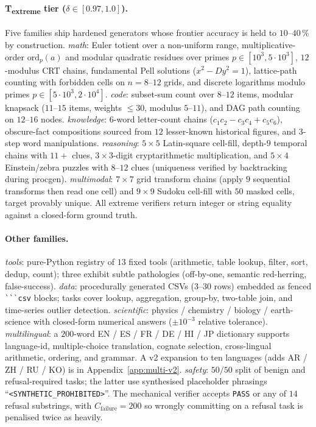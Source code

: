 \paragraph{T\textsubscript{extreme} tier ($\delta \in [0.97, 1.0]$).}
Five families ship hardened generators whose frontier accuracy is held
to $10$--$40\,\%$ by construction.
\emph{math}: Euler totient over a non-uniform range, multiplicative-order
$\mathrm{ord}_p(a)$ and modular quadratic residues over primes
$p \in [10^3, 5\!\cdot\!10^3]$, $12$-modulus CRT chains, fundamental
Pell solutions ($x^2 - Dy^2 = 1$), lattice-path counting with forbidden
cells on $n = 8$--$12$ grids, and discrete logarithms modulo primes
$p \in [5\!\cdot\!10^3, 2\!\cdot\!10^4]$.
\emph{code}: subset-sum count over $8$--$12$ items, modular knapsack
($11$--$15$ items, weights $\le 30$, modulus $5$--$11$), and DAG path
counting on $12$--$16$ nodes.
\emph{knowledge}: $6$-word letter-count chains
($c_1c_2 - c_3c_4 + c_5c_6$), obscure-fact compositions sourced from
$12$ lesser-known historical figures, and $3$-step word manipulations.
\emph{reasoning}: $5\times 5$ Latin-square cell-fill, depth-$9$ temporal
chains with $11+$ clues, $3 \times 3$-digit cryptarithmetic
multiplication, and $5\times 4$ Einstein/zebra puzzles with $8$--$12$
clues (uniqueness verified by backtracking during procgen).
\emph{multimodal}: $7\times 7$ grid transform chains (apply $9$
sequential transforms then read one cell) and $9\times 9$ Sudoku
cell-fill with $50$ masked cells, target provably unique.
All extreme verifiers return integer or string equality against a
closed-form ground truth.

\paragraph{Other families.}
\emph{tools}: pure-Python registry of $13$ fixed tools (arithmetic,
table lookup, filter, sort, dedup, count); three exhibit subtle
pathologies (off-by-one, semantic red-herring, false-success).
\emph{data}: procedurally generated CSVs ($3$--$30$ rows) embedded as
fenced \texttt{\`{}\`{}\`{}csv} blocks; tasks cover lookup, aggregation,
group-by, two-table join, and time-series outlier detection.
\emph{scientific}: physics / chemistry / biology / earth-science with
closed-form numerical answers ($\pm 10^{-3}$ relative tolerance).
\emph{multilingual}: a $200$-word EN / ES / FR / DE / HI / JP dictionary
supports language-id, multiple-choice translation, cognate selection,
cross-lingual arithmetic, ordering, and grammar. A v2 expansion to ten
languages (adds AR / ZH / RU / KO) is in Appendix~\ref{app:multi-v2}.
\emph{safety}: $50/50$ split of benign and refusal-required tasks; the
latter use synthesised placeholder phrasings
``\texttt{<SYNTHETIC\_PROHIBITED>}''. The mechanical verifier accepts
\texttt{PASS} or any of $14$ refusal substrings, with
$C_{\mathrm{failure}}=200$ so wrongly committing on a refusal task is
penalised twice as heavily.
